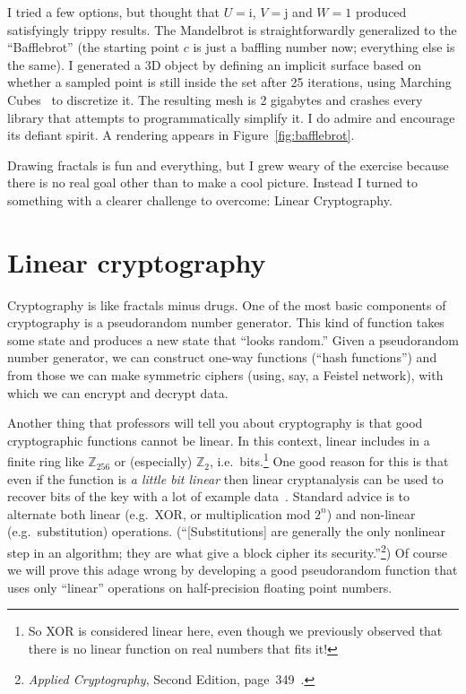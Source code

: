 \documentclass[twocolumn]{article}
\begin{document}
I tried a few options, but thought that $U = \textrm{i}$, $V =
\textrm{j}$ and $W = 1$ produced satisfyingly trippy results. The
Mandelbrot is straightforwardly generalized to the ``Bafflebrot'' (the
starting point $c$ is just a baffling number now; everything else is
the same). I generated a 3D object by defining an implicit surface
based on whether a sampled point is still inside the set after 25
iterations, using Marching Cubes~\cite{lorensen1987marching} to
discretize it. The resulting mesh is 2 gigabytes and crashes every
library that attempts to programmatically simplify it. I do admire and
encourage its defiant spirit. A rendering appears in
Figure~\ref{fig:bafflebrot}.

\medskip
Drawing fractals is fun and everything, but I grew weary of the
exercise because there is no real goal other than to make a cool
picture. Instead I turned to something with a clearer challenge to
overcome: Linear Cryptography.

\section{Linear cryptography} \label{sec:eightbitchoppy}
Cryptography is like fractals minus drugs. One of the most basic
components of cryptography is a pseudorandom number generator. This
kind of function takes some state and produces a new state that
``looks random.'' Given a pseudorandom number generator, we can
construct one-way functions (``hash functions'') and from those we can
make symmetric ciphers (using, say, a Feistel network), with which we
can encrypt and decrypt data.

Another thing that professors will tell you about cryptography is that
good cryptographic functions cannot be linear. In this context, linear
includes in a finite ring like $\mathbb{Z}_{256}$ or (especially)
$\mathbb{Z}_{2}$, i.e.~bits.\footnote{So XOR is considered linear
  here, even though we previously observed that there is no linear
  function on real numbers that fits it!} One good reason for this is
that even if the function is {\em a little bit linear} then linear
cryptanalysis can be used to recover bits of the key with a lot of
example data~\cite{matsui1994linear}. Standard advice is to alternate
both linear (e.g.~XOR, or multiplication mod $2^n$) and non-linear
(e.g.~substitution) operations. (``[Substitutions] are generally the
only nonlinear step in an algorithm; they are what give a block cipher
its security.''\footnote{{\it Applied Cryptography}, Second Edition,
  page~349~\cite{schneier1996applied}.}) Of course we will prove this
adage wrong by developing a good pseudorandom function that uses only
``linear'' operations on half-precision floating point numbers.
\end{document}
